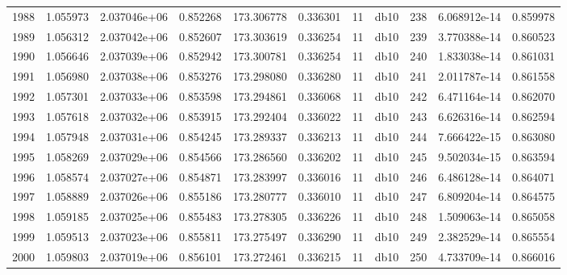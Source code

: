 \begin{tabular}{lrrrrrrlrrr}
1988 &    1.055973 &        2.037046e+06 &  0.852268 &              173.306778 &    0.336301 &      11 &         db10 &    238 &   6.068912e-14 &      0.859978 \\
1989 &    1.056312 &        2.037042e+06 &  0.852607 &              173.303619 &    0.336254 &      11 &         db10 &    239 &   3.770388e-14 &      0.860523 \\
1990 &    1.056646 &        2.037039e+06 &  0.852942 &              173.300781 &    0.336254 &      11 &         db10 &    240 &   1.833038e-14 &      0.861031 \\
1991 &    1.056980 &        2.037038e+06 &  0.853276 &              173.298080 &    0.336280 &      11 &         db10 &    241 &   2.011787e-14 &      0.861558 \\
1992 &    1.057301 &        2.037033e+06 &  0.853598 &              173.294861 &    0.336068 &      11 &         db10 &    242 &   6.471164e-14 &      0.862070 \\
1993 &    1.057618 &        2.037032e+06 &  0.853915 &              173.292404 &    0.336022 &      11 &         db10 &    243 &   6.626316e-14 &      0.862594 \\
1994 &    1.057948 &        2.037031e+06 &  0.854245 &              173.289337 &    0.336213 &      11 &         db10 &    244 &   7.666422e-15 &      0.863080 \\
1995 &    1.058269 &        2.037029e+06 &  0.854566 &              173.286560 &    0.336202 &      11 &         db10 &    245 &   9.502034e-15 &      0.863594 \\
1996 &    1.058574 &        2.037027e+06 &  0.854871 &              173.283997 &    0.336016 &      11 &         db10 &    246 &   6.486128e-14 &      0.864071 \\
1997 &    1.058889 &        2.037026e+06 &  0.855186 &              173.280777 &    0.336010 &      11 &         db10 &    247 &   6.809204e-14 &      0.864575 \\
1998 &    1.059185 &        2.037025e+06 &  0.855483 &              173.278305 &    0.336226 &      11 &         db10 &    248 &   1.509063e-14 &      0.865058 \\
1999 &    1.059513 &        2.037023e+06 &  0.855811 &              173.275497 &    0.336290 &      11 &         db10 &    249 &   2.382529e-14 &      0.865554 \\
2000 &    1.059803 &        2.037019e+06 &  0.856101 &              173.272461 &    0.336215 &      11 &         db10 &    250 &   4.733709e-14 &      0.866016 \\

\end{tabular}

